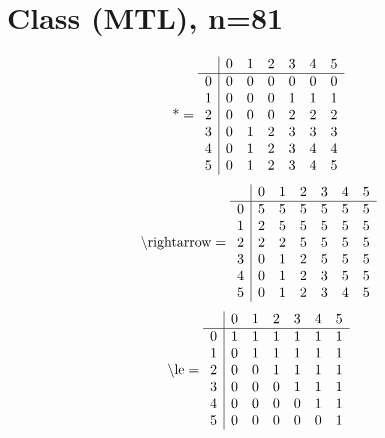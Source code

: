 \documentclass[11pt]{article}
\begin{document}
\section{Class (MTL), n=81}
\[\text{*} = 
\begin{array}{r | r r r r r r}
 & 0 & 1 & 2 & 3 & 4 & 5 \\ \hline
0 & 0 & 0 & 0 & 0 & 0 & 0 \\
1 & 0 & 0 & 0 & 1 & 1 & 1 \\
2 & 0 & 0 & 0 & 2 & 2 & 2 \\
3 & 0 & 1 & 2 & 3 & 3 & 3 \\
4 & 0 & 1 & 2 & 3 & 4 & 4 \\
5 & 0 & 1 & 2 & 3 & 4 & 5 \\
\end{array}
\]
\[\text{\textbackslash rightarrow} = 
\begin{array}{r | r r r r r r}
 & 0 & 1 & 2 & 3 & 4 & 5 \\ \hline
0 & 5 & 5 & 5 & 5 & 5 & 5 \\
1 & 2 & 5 & 5 & 5 & 5 & 5 \\
2 & 2 & 2 & 5 & 5 & 5 & 5 \\
3 & 0 & 1 & 2 & 5 & 5 & 5 \\
4 & 0 & 1 & 2 & 3 & 5 & 5 \\
5 & 0 & 1 & 2 & 3 & 4 & 5 \\
\end{array}
\]
\[\text{\textbackslash le} = 
\begin{array}{r | r r r r r r}
 & 0 & 1 & 2 & 3 & 4 & 5 \\ \hline
0 & 1 & 1 & 1 & 1 & 1 & 1 \\
1 & 0 & 1 & 1 & 1 & 1 & 1 \\
2 & 0 & 0 & 1 & 1 & 1 & 1 \\
3 & 0 & 0 & 0 & 1 & 1 & 1 \\
4 & 0 & 0 & 0 & 0 & 1 & 1 \\
5 & 0 & 0 & 0 & 0 & 0 & 1 \\
\end{array}
\]
\end{document}
